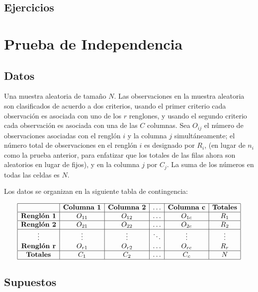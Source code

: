 \documentclass[
  a4paper,
  oneside,
  openany]{book}
\begin{document}
\hypertarget{ejercicios-7}{%
\section{Ejercicios}\label{ejercicios-7}}

\hypertarget{prueba-de-independencia}{%
\chapter{Prueba de Independencia}\label{prueba-de-independencia}}

\hypertarget{datos-11}{%
\section{Datos}\label{datos-11}}

Una muestra aleatoria de tamaño \(N\). Las observaciones en la muestra aleatoria son clasificados de acuerdo a dos criterios, usando el primer criterio cada observación es asociada con uno de los \(r\) renglones, y usando el segundo criterio cada observación es asociada con una de las \(C\) columnas.
Sea \(O_{ij}\) el número de observaciones asociadas con el renglón \(i\) y la columna \(j\) simultáneamente; el número total de observaciones en el renglón \(i\) es designado por \(R_{i}\), (en lugar de \(n_{i}\) como la prueba anterior, para enfatizar que los totales de las filas ahora son aleatorios en lugar de fijos), y en la columna \(j\) por \(C_{j}\). La suma de los números en todas las celdas es \(N\).

Los datos se organizan en la siguiente tabla de contingencia:

\[
\begin{array}{|c|c|c|c|c|c|} 
\hline
&\textbf{Columna 1} &\textbf{Columna 2} &\ldots&\textbf{Columna c}&\textbf{Totales}\\
\hline
\textbf{Renglón 1} &O_{11} &O_{12} &\ldots&O_{1c}&R_1\\
\hline
\textbf{Renglón 2} &O_{21} &O_{22} &\ldots&O_{2c}&R_2\\
\hline
\vdots& \vdots& \vdots& \ddots&\vdots& \vdots\\
\textbf{Renglón r}&O_{r1} &O_{r2} &\ldots&O_{rc}&R_r\\
\hline
\textbf{Totales}&C_1&C_2&\ldots&C_c&N\\
\hline
\end {array}
\]

\hypertarget{supuestos-10}{%
\section{Supuestos}\label{supuestos-10}}
\end{document}
